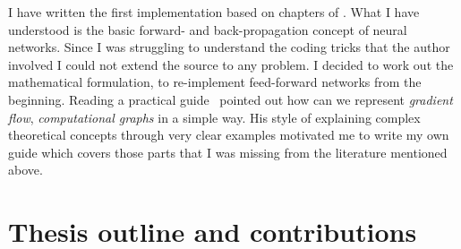 I have written the first implementation based on chapters of \cite{nnsdl}. 
What I have understood is the basic forward- and back-propagation \cite{werbos1994roots} concept of neural networks.
Since I was struggling to understand the coding tricks that the author involved 
I could not extend the source to any problem.
I decided to work out the mathematical formulation, to re-implement feed-forward networks from the beginning.
Reading a practical guide~\cite{karpathyblog} pointed out how can we represent \emph{gradient flow}, \emph{computational graphs} in a simple way.
His style of explaining complex theoretical concepts through very clear examples motivated me to
write my own guide which covers those parts that I was missing from the literature mentioned above.



\section{Thesis outline and contributions}






%
